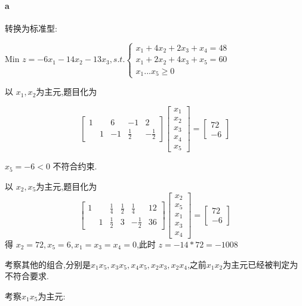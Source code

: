 \documentclass[a4paper]{article}
\begin{document}
\paragraph{a}

转换为标准型:

Min \(z=-6x_1-14x_2-13x_3 , s.t. \left\{\begin{aligned}
  x_1+4x_2+2x_3+x_4=48 \\
  x_1+2x_2+4x_3+x_5=60 \\
x_1 ... x_5 \geq 0
\end{aligned}\right.\)

以 $x_1,x_2$为主元,题目化为

\[
\begin{bmatrix}
1 &   & 6 & -1 & 2 \\
  & 1 & -1 & \frac{1}{2} & -\frac{1}{2}
\end{bmatrix} 
\begin{bmatrix}
    x_1 \\ x_2 \\ x_3 \\ x_4 \\ x_5
\end{bmatrix} 
= \begin{bmatrix}
    72 \\ -6
\end{bmatrix}
\]
 
$x_5 = -6 < 0 $ 不符合约束.



以 $x_2,x_5$为主元,题目化为
\[
\begin{bmatrix}
1 &   & \frac{1}{4} & \frac{1}{2} & \frac{1}{4} & 12 \\
  & 1 & \frac{1}{2} & 3 & -\frac{1}{2} & 36
\end{bmatrix}
\begin{bmatrix}
    x_2 \\ x_5 \\ x_1 \\ x_3 \\ x_4
\end{bmatrix} 
= \begin{bmatrix}
    72 \\ -6
\end{bmatrix}
\]
得 $x_2 = 72, x_5 = 6, x_1 = x_3 = x_4 = 0$,此时 $z = -14 * 72 = -1008$

考察其他的组合,分别是$x_1x_5, x_3x_5, x_4 x_5, x_2x_3,x_2x_4$,之前$x_1x_2$为主元已经被判定为不符合要求.

考察$x_1x_5$为主元:
\end{document}
